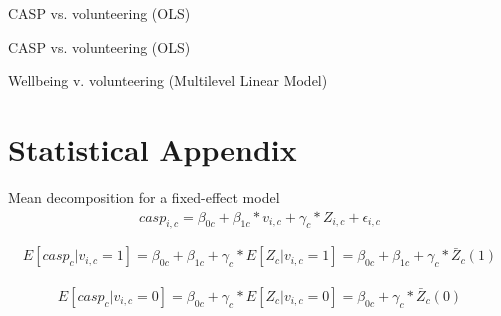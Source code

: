 \documentclass[10pt, letterpaper]{article}
\begin{document}
\begin{spacing}{1.4}
\begin{spacing}{.9}
\begin{spacing}{.9}
\begin{table}[H]
\centering 
\caption{CASP vs. volunteering (OLS)}  
\begin{scriptsize} 
	 
      \label{SepMod} 
\end{scriptsize}
\end{table}
\end{spacing}

\begin{spacing}{.9}
\begin{table}[H]
\centering 
\caption{CASP vs. volunteering (OLS)}  
\begin{scriptsize} 
	 
      \label{SepMod1} 
\end{scriptsize}
\end{table}
\end{spacing}




\begin{spacing}{.9}
\begin{table}[H]
\centering 
\caption{Wellbeing v. volunteering (Multilevel Linear Model)}  
\begin{scriptsize} 
	 
      \label{regB} 
\end{scriptsize}
\end{table}
\end{spacing}





\section{Statistical Appendix}

Mean decomposition for a fixed-effect model \\
 \begin{eqnarray}
	casp_{i,c}= \beta_{0c}+ \beta_{1c}*v_{i,c} + \gamma_{c}*Z_{i,c} + \epsilon_{i,c}
 \end{eqnarray}

\[ E[casp_{c}|v_{i,c}=1]= \beta_{0c}+\beta_{1c} + \gamma_{c}*E[Z_{c}|v_{i,c}=1]=\beta_{0c}+\beta_{1c} + \gamma_{c}*\bar{Z}_{c}(1) \]	\\
	
\[	E[casp_{c}|v_{i,c}=0]= \beta_{0c}+ \gamma_{c}*E[Z_{c}|v_{i,c}=0]=\beta_{0c}+ \gamma_{c}*\bar{Z}_{c}(0) \] \\
	

\end{spacing}
\end{spacing}
\end{document}
